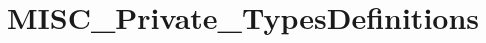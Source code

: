 \hypertarget{group___m_i_s_c___private___types_definitions}{\section{M\-I\-S\-C\-\_\-\-Private\-\_\-\-Types\-Definitions}
\label{group___m_i_s_c___private___types_definitions}
}
